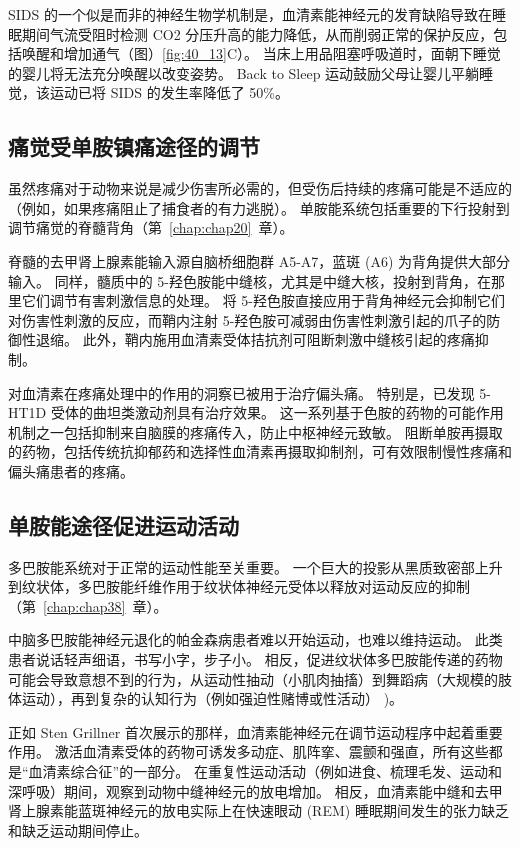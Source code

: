 SIDS 的一个似是而非的神经生物学机制是，血清素能神经元的发育缺陷导致在睡眠期间气流受阻时检测 CO2 分压升高的能力降低，从而削弱正常的保护反应，包括唤醒和增加通气（图）\ref{fig:40_13}C）。
当床上用品阻塞呼吸道时，面朝下睡觉的婴儿将无法充分唤醒以改变姿势。
Back to Sleep 运动鼓励父母让婴儿平躺睡觉，该运动已将 SIDS 的发生率降低了 50\%。



\subsection{痛觉受单胺镇痛途径的调节}

虽然疼痛对于动物来说是减少伤害所必需的，但受伤后持续的疼痛可能是不适应的（例如，如果疼痛阻止了捕食者的有力逃脱）。
单胺能系统包括重要的下行投射到调节痛觉的脊髓背角（第~\ref{chap:chap20}~章）。


脊髓的去甲肾上腺素能输入源自脑桥细胞群 A5-A7，蓝斑 (A6) 为背角提供大部分输入。
同样，髓质中的 5-羟色胺能中缝核，尤其是中缝大核，投射到背角，在那里它们调节有害刺激信息的处理。
将 5-羟色胺直接应用于背角神经元会抑制它们对伤害性刺激的反应，而鞘内注射 5-羟色胺可减弱由伤害性刺激引起的爪子的防御性退缩。
此外，鞘内施用血清素受体拮抗剂可阻断刺激中缝核引起的疼痛抑制。


对血清素在疼痛处理中的作用的洞察已被用于治疗偏头痛。
特别是，已发现 5-HT1D 受体的曲坦类激动剂具有治疗效果。
这一系列基于色胺的药物的可能作用机制之一包括抑制来自脑膜的疼痛传入，防止中枢神经元致敏。
阻断单胺再摄取的药物，包括传统抗抑郁药和选择性血清素再摄取抑制剂，可有效限制慢性疼痛和偏头痛患者的疼痛。



\subsection{单胺能途径促进运动活动}

多巴胺能系统对于正常的运动性能至关重要。
一个巨大的投影从黑质致密部上升到纹状体，多巴胺能纤维作用于纹状体神经元受体以释放对运动反应的抑制（第~\ref{chap:chap38}~章）。


中脑多巴胺能神经元退化的帕金森病患者难以开始运动，也难以维持运动。
此类患者说话轻声细语，书写小字，步子小。 相反，促进纹状体多巴胺能传递的药物可能会导致意想不到的行为，从运动性抽动（小肌肉抽搐）到舞蹈病（大规模的肢体运动），再到复杂的认知行为（例如强迫性赌博或性活动） )。


正如 Sten Grillner 首次展示的那样，血清素能神经元在调节运动程序中起着重要作用。
激活血清素受体的药物可诱发多动症、肌阵挛、震颤和强直，所有这些都是“血清素综合征”的一部分。
在重复性运动活动（例如进食、梳理毛发、运动和深呼吸）期间，观察到动物中缝神经元的放电增加。
相反，血清素能中缝和去甲肾上腺素能蓝斑神经元的放电实际上在快速眼动 (REM) 睡眠期间发生的张力缺乏和缺乏运动期间停止。


